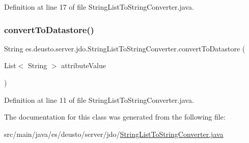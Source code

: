 Definition at line 17 of file String\+List\+To\+String\+Converter.\+java.

\mbox{\label{classes_1_1deusto_1_1server_1_1jdo_1_1_string_list_to_string_converter_a97a5081037fd91b4787b2c9cc8992c5f}} 
\subsubsection{\texorpdfstring{convertToDatastore()}{convertToDatastore()}}
{\footnotesize\ttfamily String es.\+deusto.\+server.\+jdo.\+String\+List\+To\+String\+Converter.\+convert\+To\+Datastore (\begin{DoxyParamCaption}\item[{List$<$ String $>$}]{attribute\+Value }\end{DoxyParamCaption})}



Definition at line 11 of file String\+List\+To\+String\+Converter.\+java.



The documentation for this class was generated from the following file\+:\begin{DoxyCompactItemize}
\item 
src/main/java/es/deusto/server/jdo/\mbox{\hyperlink{_string_list_to_string_converter_8java}{String\+List\+To\+String\+Converter.\+java}}\end{DoxyCompactItemize}
